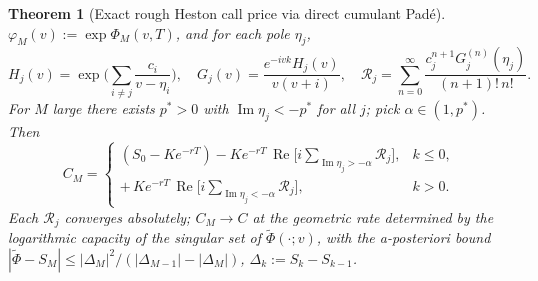 \documentclass{article}
\newtheorem{theorem}{Theorem}
\newcommand{\Real}{\operatorname{Re}}
\newcommand{\Imag}{\operatorname{Im}}
\begin{document}
\begin{theorem}[Exact rough Heston call price via direct cumulant Pad\'{e}]
\[\]
$\varphi_M(v):=\exp\Phi_M(v,T)$, and for each pole $\eta_j$,
\[
H_j(v)=\exp\!\Big(\sum_{i\ne j}\frac{c_i}{v-\eta_i}\Big),\quad
G_j(v)=\frac{e^{-ivk}H_j(v)}{v(v+i)},\quad
\mathcal{R}_j=\sum_{n=0}^\infty\frac{c_j^{n+1}G_j^{(n)}(\eta_j)}{(n+1)!\,n!}.
\]
For $M$ large there exists $p^\ast>0$ with $\Imag\eta_j<-p^\ast$ for
all $j$; pick $\alpha\in(1,p^\ast)$. Then
\begin{equation}\label{eq:price}
\boxed{\;
C_M=\begin{cases}
(S_0-Ke^{-rT})-Ke^{-rT}\,\Real\!\Big[i\!\!\!\sum_{\Imag\eta_j>-\alpha}\!\!\!\mathcal{R}_j\Big],&k\le 0,\\[1.3ex]
+\,Ke^{-rT}\,\Real\!\Big[i\!\!\!\sum_{\Imag\eta_j<-\alpha}\!\!\!\mathcal{R}_j\Big],&k>0.
\end{cases}
\;}
\end{equation}
Each $\mathcal{R}_j$ converges absolutely; $C_M\to C$ at the geometric
rate determined by the logarithmic capacity of the singular set of
$\widetilde\Phi(\cdot;v)$, with the a-posteriori bound
$|\widetilde\Phi-S_M|\le|\Delta_M|^2/(|\Delta_{M-1}|-|\Delta_M|)$,
$\Delta_k:=S_k-S_{k-1}$.
\end{theorem}
\end{document}
